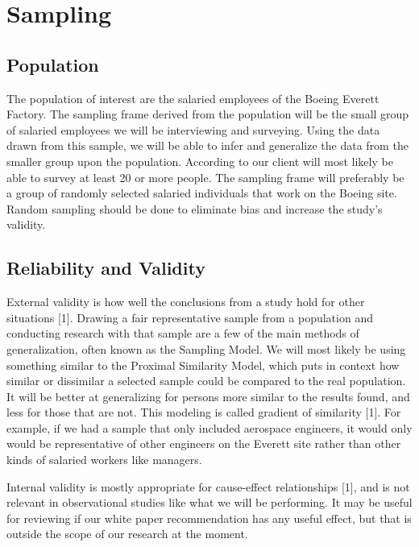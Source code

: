 \documentclass[onecolumn, draftclsnofoot,10pt, compsoc]{IEEEtran}
\begin{document}
\section{Sampling}
    \subsection{Population}
    \indent \indent The population of interest are the salaried employees of the Boeing Everett Factory. 
    The sampling frame derived from the population will be the small group of salaried employees we will be interviewing and surveying. 
    Using the data drawn from this sample, we will be able to infer and generalize the data from the smaller group upon the population. 
    According to our client will most likely be able to survey at least 20 or more people. 
    The sampling frame will preferably be a group of randomly selected salaried individuals that work on the Boeing site. 
    Random sampling should be done to eliminate bias and increase the study’s validity. 

    \subsection{Reliability and Validity}
    \indent \indent External validity is how well the conclusions from a study hold for other situations [1]. 
    Drawing a fair representative sample from a population and conducting research with that sample are a few of the main methods of generalization, often known as the Sampling Model. 
    We will most likely be using something similar to the Proximal Similarity Model, which puts in context how similar or dissimilar a selected sample could be compared to the real population. 
    It will be better at generalizing for persons more similar to the results found, and less for those that are not.
    This modeling is called gradient of similarity [1]. 
    For example, if we had a sample that only included aerospace engineers, it would only would be representative of other engineers on the Everett site rather than other kinds of salaried workers like managers.
    
    Internal validity is mostly appropriate for cause-effect relationships [1], and is not relevant in observational studies like what we will be performing. 
    It may be useful for reviewing if our white paper recommendation has any useful effect, but that is outside the scope of our research at the moment.  

\end{document}
